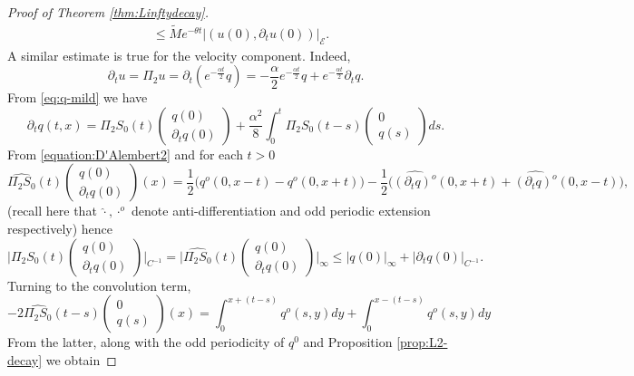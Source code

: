 \documentclass[10pt, reqno]{amsart}
\newcommand{\e}{\mathcal{E}}
\theoremstyle{definition}
\numberwithin{lem}{section}
\numberwithin{cor}{section}
\numberwithin{prop}{section}
\numberwithin{thm}{section}
\numberwithin{dfn}{section}
\begin{document}
\begin{proof}[Proof of Theorem \ref{thm:Linftydecay}]
\begin{align*}
		&\leq \tilde{M} e^{-\theta t} |(u(0), \partial_tu(0))|_{\e}.
	\end{align*}
	A similar estimate is true for the velocity component. Indeed, 
 \begin{equation}\label{eq:uvelocity}
     \partial_tu=\Pi_2u=\partial_t(e^{-\frac{\alpha t}{2}}q)=-\frac{\alpha }{2}e^{-\frac{\alpha t}{2}}q+e^{-\frac{\alpha t}{2}}\partial_tq.  
 \end{equation}   
\noindent From \eqref{eq:q-mild} we have
\begin{equation} \label{eq:qvelocity}
	\partial_tq(t,x)=  \Pi_2 S_0(t) \begin{pmatrix} q(0) \\ \partial_tq(0) \end{pmatrix} + \frac{\alpha^2}{8}\int_0^t\Pi_2S_0(t-s)\begin{pmatrix} 0 \\ q(s) \end{pmatrix}ds.
\end{equation}
From \eqref{equation:D'Alembert2} and for each $t>0$ 
\begin{equation*}
    \widehat{\Pi_2S_0}(t)\begin{pmatrix} q(0) \\ \partial_tq(0) \end{pmatrix}(x)=\frac{1}{2}\big(q^o(0, x-t)-q^o(0, x+t)\big)-\frac{1}{2}\big(\widehat{(\partial_t q)^o }(0, x+t)+\widehat{(\partial_t q)^o }(0, x-t)\big),
\end{equation*}
(recall here that $\hat{\cdot}, \cdot^o $ denote anti-differentiation and odd periodic extension respectively)  hence 
\begin{equation*}
\bigg|\Pi_2S_0(t)\begin{pmatrix} q(0) \\ \partial_tq(0) \end{pmatrix}\bigg|_{C^{-1}}=\bigg|\widehat{\Pi_2S_0}(t)\begin{pmatrix} q(0) \\ \partial_tq(0) \end{pmatrix}\bigg|_{\infty}\leq |q(0)|_{\infty}+|\partial_tq(0)|_{C^{-1}}.
\end{equation*}
Turning to the convolution term,
\begin{equation*}
-2\widehat{\Pi_2S_0}(t-s)\begin{pmatrix} 0 \\ q(s) \end{pmatrix}(x)=\int_0^{x+(t-s)}q^o(s,y)dy+\int_0^{x-(t-s)}q^o(s,y)dy
\end{equation*}
From the latter, along with  the odd periodicity of $q^0$ and Proposition \ref{prop:L2-decay} we obtain 


\end{proof}
\end{document}
